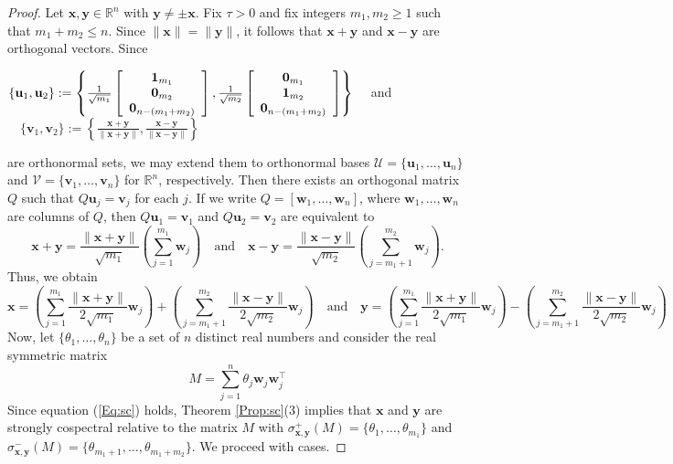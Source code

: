 \documentclass[10pt,a4paper]{amsart}
\def\R{\mathbb{R}}
\newcommand{\bu}{\mathbf u}
\newcommand{\bv}{\mathbf v}
\newcommand{\bw}{\mathbf w}
\newcommand{\bx}{\mathbf x}
\newcommand{\by}{\mathbf y}
\newcommand{\ones}{{\bf{1}}}
\newcommand{\zero}{{\bf{0}}}
\begin{document}
\begin{proof}
Let $\bx,\by\in\R^n$ with $\by\neq\pm \bx$. Fix $\tau>0$ and fix integers $m_1,m_2\geq 1$ such that $m_1+m_2\leq n$. Since $\|\bx\|=\|\by\|$, it follows that $\bx+\by$ and $\bx-\by$ are orthogonal vectors. Since
\begin{center}
$\{\bu_1,\bu_2\}:=\left\{\frac{1}{\sqrt{m_1}}\left[\begin{array}{ccc} \ones_{m_1} \\ \zero_{m_2} \\ \zero_{n-(m_1+m_2)} \end{array} \right],\frac{1}{\sqrt{m_2}}\left[\begin{array}{ccc} \zero_{m_1} \\ \ones_{m_2} \\ \zero_{n-(m_1+m_2)} \end{array} \right]\right\}\quad $ and $\quad \{\bv_1,\bv_2\}:=\left\{\frac{\bx+\by}{\|\bx+\by\|},\frac{\bx-\by}{\|\bx-\by\|}\right\}$    
\end{center}
are orthonormal sets, we may extend them to orthonormal bases $\mathcal{U}=\{\bu_1,\ldots,\bu_n\}$ and $\mathcal{V}=\{\bv_1,\ldots,\bv_n\}$ for $\R^n$, respectively. Then there exists an orthogonal matrix $Q$ such that $Q\bu_j=\bv_j$ for each $j$. If we write $Q=[\bw_1,\ldots,\bw_n]$, where $\bw_1,\ldots,\bw_n$ are columns of $Q$, then $Q\bu_1=\bv_1$ and $Q\bu_2=\bv_2$ are equivalent to
\begin{equation*}
\bx+\by=\displaystyle\frac{\|\bx+\by\|}{\sqrt{m_1}}\left(\sum_{j=1}^{m_1}\bw_j\right)\quad \text{and} \quad \bx-\by=\displaystyle\frac{\|\bx-\by\|}{\sqrt{m_2}}\left(\sum_{j=m_1+1}^{m_2}\bw_j\right).
\end{equation*}
Thus, we obtain
\begin{equation}
\label{Eq:sc}
\bx=\displaystyle\left(\sum_{j=1}^{m_1}\displaystyle\frac{\|\bx+\by\|}{2\sqrt{m_1}}\bw_j\right)+\left(\sum_{j=m_1+1}^{m_2}\displaystyle\frac{\|\bx-\by\|}{2\sqrt{m_2}}\bw_j\right)\quad \text{and} \quad \by=\displaystyle\left(\sum_{j=1}^{m_1}\displaystyle\frac{\|\bx+\by\|}{2\sqrt{m_1}}\bw_j\right)-\left(\sum_{j=m_1+1}^{m_2}\displaystyle\frac{\|\bx-\by\|}{2\sqrt{m_2}}\bw_j\right)
\end{equation}
Now, let 
$\{\theta_1,\ldots,\theta_{n}\}$ be a set of $n$ distinct real numbers and consider the real symmetric matrix
\begin{equation*}
M=\sum_{j=1}^{n}\theta_j\bw_j\bw_j^\top
\end{equation*}
Since equation (\ref{Eq:sc}) holds, Theorem \ref{Prop:sc}(3) implies that $\bx$ and $\by$ are strongly cospectral relative to the matrix $M$ with $\sigma_{\bx,\by}^+(M)=\{\theta_1,\ldots,\theta_{m_1}\}$ and $\sigma_{\bx,\by}^-(M)=\{\theta_{m_1+1},\ldots,\theta_{m_1+m_2}\}$. We proceed with cases.


\end{proof}
\end{document}
